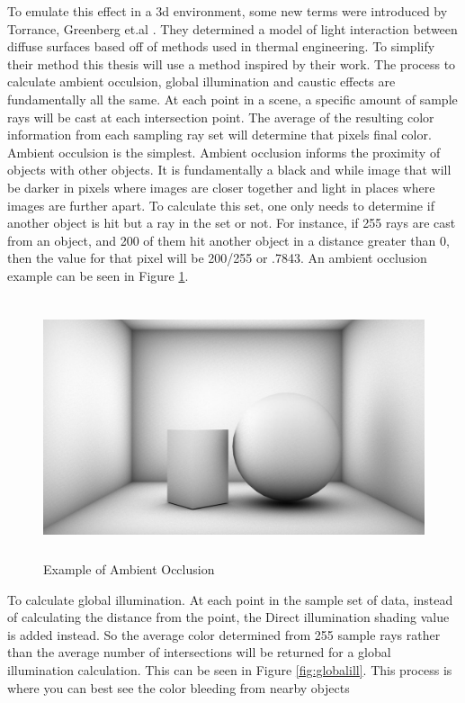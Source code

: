 To emulate this effect in a 3d environment, some new terms were introduced by Torrance, Greenberg et.al \cite{Goral:1984}.  They determined a model of light interaction between diffuse surfaces based off of methods used in thermal engineering.  To simplify their method this thesis will use a method inspired by their work.  The process to calculate ambient occulsion, global illumination and caustic effects are fundamentally all the same.  At each point in a scene, a specific amount of sample rays will be cast at each intersection point.  The average of the resulting color information from each sampling ray set will determine that pixels final color.  Ambient occulsion is the simplest.  Ambient occlusion informs the proximity of objects with other objects.  It is fundamentally a black and while image that will be darker in pixels where images are closer together and light in places where images are further apart.  To calculate this set, one only needs to determine if another object is hit but a ray in the set or not.  For instance, if 255 rays are cast from an object, and 200 of them hit another object in a distance greater than 0, then the value for that pixel will be 200/255 or .7843.  An ambient occlusion example can be seen in Figure \ref{fig:aOcclusion}.

\begin{figure}[h]
\centering
\includegraphics[height=3.0in]{figures/aOcclusion.jpg}
\caption{Example of Ambient Occlusion}
\label{fig:aOcclusion}
\end{figure}

To calculate global illumination.  At each point in the sample set of data, instead of calculating the distance from the point, the Direct illumination shading value is added instead.  So the average color determined from 255 sample rays rather than the average number of intersections will be returned for a global illumination calculation.  This can be seen in Figure \ref{fig:globalill}.  This process is where you can best see the color bleeding from nearby objects

